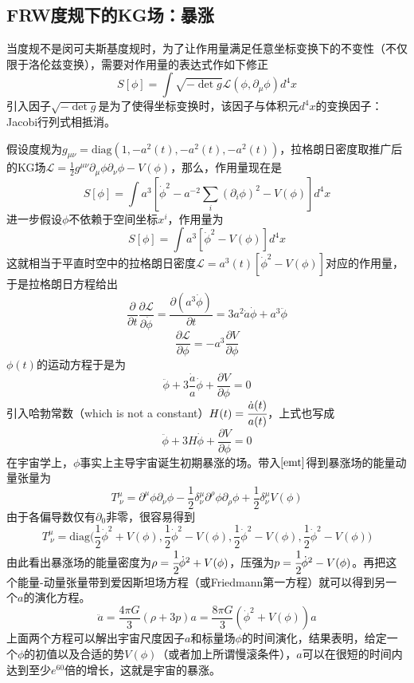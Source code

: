 \documentclass[a4paper,11pt]{ctexart}
\newcommand{\beq}{\begin{equation}}
\newcommand{\eeq}{\end{equation}}
\newcommand{\lag}{\mathcal{L}}
\newcommand{\diag}{\mathrm{diag}}
\begin{document}
\subsection{FRW度规下的KG场：暴涨}
当度规不是闵可夫斯基度规时，为了让作用量满足任意坐标变换下的不变性（不仅限于洛伦兹变换），需要对作用量的表达式作如下修正
\beq
S[\phi] = \int \sqrt{ - \det g} \lag(\phi,\partial_\mu \phi) d^4 x
\eeq
引入因子$\sqrt{ - \det g}$是为了使得坐标变换时，该因子与体积元$d^4 x$的变换因子：Jacobi行列式相抵消。
\par
假设度规为$g_{\mu \nu} = \diag(1,-a^2(t),-a^2(t),-a^2(t))$，拉格朗日密度取推广后的KG场$\lag = \frac{1}{2} g^{\mu \nu} \partial_\mu \phi \partial_\nu \phi - V(\phi)$，那么，作用量现在是
\beq
S[\phi] = \int a^3 [\dot{\phi}^2 - a^{-2} \sum_i (\partial_i \phi)^2 - V(\phi)]d^4 x
\eeq
进一步假设$\phi$不依赖于空间坐标$x^i$，作用量为
\beq
S[\phi] = \int a^3[ \dot{\phi}^2 - V(\phi)]d^4 x
\eeq
这就相当于平直时空中的拉格朗日密度$\lag = a^3(t) [\dot{\phi}^2 - V(\phi)]$对应的作用量，于是拉格朗日方程给出
\beq
\frac{\partial}{\partial t} \frac{\partial \lag}{\partial \dot{\phi}} = \frac{\partial (a^3 \dot{\phi})}{\partial t} = 3a^2 \dot{a} \dot{\phi} + a^3 \ddot{\phi}
\eeq
\beq
\frac{\partial \lag}{\partial \phi} = - a^3 \frac{\partial V}{\partial \phi}
\eeq
$\phi (t)$的运动方程于是为
\beq
\ddot{\phi} + 3\frac{\dot{a}}{a} \dot{\phi} + \frac{\partial V}{\partial \phi} = 0
\eeq
引入哈勃常数（which is not a constant）$H(t) = \cfrac{\dot{a}(t)}{a(t)}$，上式也写成
\beq
\ddot{\phi} + 3H \dot{\phi} + \frac{\partial V}{\partial \phi} = 0
\eeq
在宇宙学上，$\phi$事实上主导宇宙诞生初期暴涨的场。带入$\cref{emt}$得到暴涨场的能量动量张量为
\beq
T^\mu_{\ \nu} = \partial^\mu \phi \partial_\nu \phi - \frac{1}{2} \delta^\mu_\nu \partial^\rho \phi \partial_\rho \phi + \frac{1}{2} \delta^\mu_\nu V(\phi)
\eeq
由于各偏导数仅有$\partial_0$非零，很容易得到
\beq
T^\mu_{\ \nu} = \diag \big(\frac{1}{2}\dot{\phi}^2 + V(\phi),\frac{1}{2}\dot{\phi}^2 - V(\phi),\frac{1}{2}\dot{\phi}^2 - V(\phi),\frac{1}{2}\dot{\phi}^2 - V(\phi)\big)
\eeq
由此看出暴涨场的能量密度为$\rho = \cfrac{1}{2}\dot{\phi}^2 + V(\phi)$，压强为$p = \cfrac{1}{2}\dot{\phi}^2 - V(\phi)$。再把这个能量-动量张量带到爱因斯坦场方程（或Friedmann第一方程）就可以得到另一个$a$的演化方程。
\beq
\ddot{a} = \frac{4\pi G}{3} (\rho + 3p)a = \frac{8\pi G}{3} (\dot{\phi}^2 + V(\phi))a
\eeq
上面两个方程可以解出宇宙尺度因子$a$和标量场$\phi$的时间演化，结果表明，给定一个$\phi$的初值以及合适的势$V(\phi)$（或者加上所谓慢滚条件），$a$可以在很短的时间内达到至少$e^{60}$倍的增长，这就是宇宙的暴涨。
\end{document}
